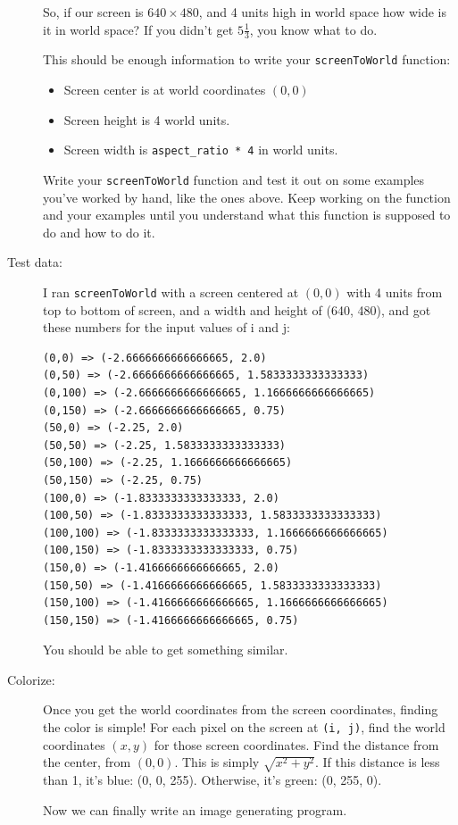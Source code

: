 \documentclass[12pt]{article}
\begin{document}
\begin{description}
So, if our screen is $640\times 480$, and 4 units
high in world space how wide is it
in world space?  If you didn't get $5\frac{1}{3}$, you
know what to do.

This should be enough information to
write your \lstinline{screenToWorld} function:
\begin{itemize}
\item Screen center is at world coordinates $(0,0)$
\item Screen height is 4 world units.
\item Screen width is \lstinline{aspect_ratio * 4}
in world units.
\end{itemize}
Write your \lstinline{screenToWorld} function and
test it out on some examples you've worked by hand,
like the ones above.
Keep working on the function and your examples
until you understand what this function is supposed
to do and how to do it.

\item[Test data:]  I ran \lstinline{screenToWorld}
with a screen centered at $(0,0)$ with 4 units
from top to bottom of screen, and a width and height
of (640, 480), and got these numbers for the input 
values of i and j:
\begin{lstlisting}
(0,0) => (-2.6666666666666665, 2.0)
(0,50) => (-2.6666666666666665, 1.5833333333333333)
(0,100) => (-2.6666666666666665, 1.1666666666666665)
(0,150) => (-2.6666666666666665, 0.75)
(50,0) => (-2.25, 2.0)
(50,50) => (-2.25, 1.5833333333333333)
(50,100) => (-2.25, 1.1666666666666665)
(50,150) => (-2.25, 0.75)
(100,0) => (-1.8333333333333333, 2.0)
(100,50) => (-1.8333333333333333, 1.5833333333333333)
(100,100) => (-1.8333333333333333, 1.1666666666666665)
(100,150) => (-1.8333333333333333, 0.75)
(150,0) => (-1.4166666666666665, 2.0)
(150,50) => (-1.4166666666666665, 1.5833333333333333)
(150,100) => (-1.4166666666666665, 1.1666666666666665)
(150,150) => (-1.4166666666666665, 0.75)
\end{lstlisting}
You should be able to get something similar.

\item[Colorize:] Once you get the world coordinates from
the screen coordinates, finding the color is simple!
For each pixel on the screen at \lstinline{(i, j)}, find the
world coordinates $(x,y)$ for those screen coordinates.
Find the distance from the center, from $(0,0)$.
This is simply $\sqrt{x^2 + y^2}$.
If this distance is less than 1, it's blue: (0, 0, 255).  
Otherwise,
it's green: (0, 255, 0).

Now we can finally write an image generating program.


\end{description}
\end{document}
